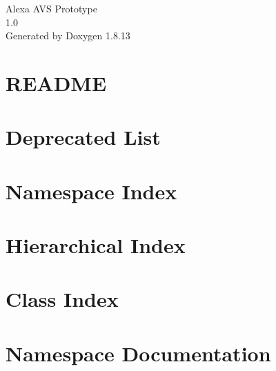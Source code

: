 \documentclass[twoside]{book}
\newcommand{\+}{\discretionary{\mbox{\scriptsize$\hookleftarrow$}}{}{}}
\newcommand{\clearemptydoublepage}{%
  \newpage{\pagestyle{empty}\cleardoublepage}%
}
\begin{document}
\hypersetup{pageanchor=false,
             bookmarksnumbered=true,
             pdfencoding=unicode
            }
\begin{titlepage}
\vspace*{7cm}
\begin{center}%
{\Large Alexa A\+VS Prototype \\[1ex]\large 1.\+0 }\\
\vspace*{1cm}
{\large Generated by Doxygen 1.8.13}\\
\end{center}
\end{titlepage}
\clearemptydoublepage
{}
\tableofcontents
\clearemptydoublepage
{}
\hypersetup{pageanchor=true}

\chapter{R\+E\+A\+D\+ME}
\label{md__home_mutzi_progs_linux_workspace_alexa-avs-prototype_src_README}

\chapter{Deprecated List}
\label{deprecated}

\chapter{Namespace Index}

\chapter{Hierarchical Index}

\chapter{Class Index}

\chapter{Namespace Documentation}


\end{document}
